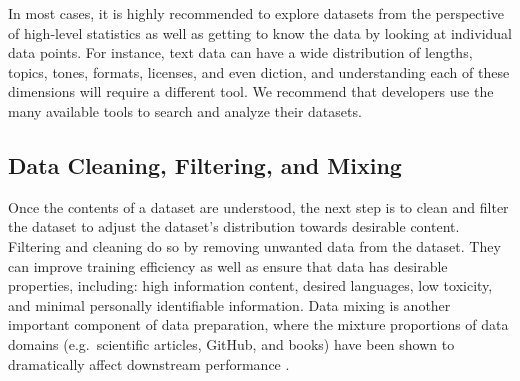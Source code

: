 In most cases, it is highly recommended to explore datasets from the perspective of high-level statistics as well as getting to know the data by looking at individual data points. For instance, text data can have a wide distribution of lengths, topics, tones, formats, licenses, and even diction, and understanding each of these dimensions will require a different tool. We recommend that developers use the many available tools to search and analyze their datasets.


\subsection{Data Cleaning, Filtering, and Mixing}
Once the contents of a dataset are understood, the next step is to clean and filter the dataset to adjust the dataset's distribution towards desirable content. Filtering and cleaning do so by removing unwanted data from the dataset. They can improve training efficiency as well as ensure that data has desirable properties, including: high information content, desired languages, low toxicity, and minimal personally identifiable information. Data mixing is another important component of data preparation, where the mixture proportions of data domains (e.g.\ scientific articles, GitHub, and books) have been shown to dramatically affect downstream performance \citep{gao2020pile, xie2023doremi, albalak2023efficient}.

